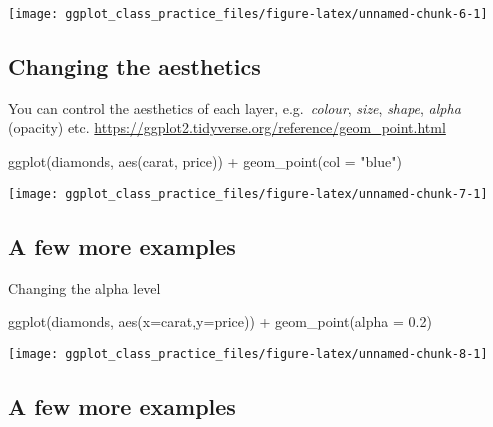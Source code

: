 \documentclass[
]{article}
\newenvironment{Shaded}{\begin{snugshade}}{\end{snugshade}}
\newcommand{\AttributeTok}[1]{\textcolor[rgb]{0.77,0.63,0.00}{#1}}
\newcommand{\FloatTok}[1]{\textcolor[rgb]{0.00,0.00,0.81}{#1}}
\newcommand{\FunctionTok}[1]{\textcolor[rgb]{0.00,0.00,0.00}{#1}}
\newcommand{\NormalTok}[1]{#1}
\newcommand{\SpecialCharTok}[1]{\textcolor[rgb]{0.00,0.00,0.00}{#1}}
\newcommand{\StringTok}[1]{\textcolor[rgb]{0.31,0.60,0.02}{#1}}
\begin{document}
\begin{center}\texttt{[image: ggplot\_class\_practice\_files/figure-latex/unnamed-chunk-6-1]} \end{center}

\hypertarget{changing-the-aesthetics}{%
\subsection{Changing the aesthetics}\label{changing-the-aesthetics}}

You can control the aesthetics of each layer, e.g.~\emph{colour},
\emph{size}, \emph{shape}, \emph{alpha} (opacity) etc.
\url{https://ggplot2.tidyverse.org/reference/geom_point.html}

\begin{Shaded}
\begin{Highlighting}[]
\FunctionTok{ggplot}\NormalTok{(diamonds, }\FunctionTok{aes}\NormalTok{(carat, price)) }\SpecialCharTok{+} \FunctionTok{geom\_point}\NormalTok{(}\AttributeTok{col =} \StringTok{"blue"}\NormalTok{)}
\end{Highlighting}
\end{Shaded}

\begin{center}\texttt{[image: ggplot\_class\_practice\_files/figure-latex/unnamed-chunk-7-1]} \end{center}

\hypertarget{a-few-more-examples}{%
\subsection{A few more examples}\label{a-few-more-examples}}

Changing the alpha level

\begin{Shaded}
\begin{Highlighting}[]
\FunctionTok{ggplot}\NormalTok{(diamonds, }\FunctionTok{aes}\NormalTok{(}\AttributeTok{x=}\NormalTok{carat,}\AttributeTok{y=}\NormalTok{price)) }\SpecialCharTok{+} \FunctionTok{geom\_point}\NormalTok{(}\AttributeTok{alpha =} \FloatTok{0.2}\NormalTok{)}
\end{Highlighting}
\end{Shaded}

\begin{center}\texttt{[image: ggplot\_class\_practice\_files/figure-latex/unnamed-chunk-8-1]} \end{center}

\hypertarget{a-few-more-examples-1}{%
\subsection{A few more examples}\label{a-few-more-examples-1}}
\end{document}
